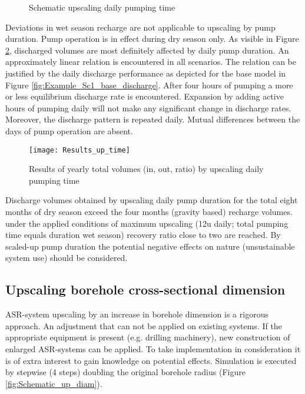 \begin{figure}[H]
\centering
{}
\captionsetup{justification=centering}
\caption{Schematic upscaling daily pumping time}
\label{fig:Schematic_up_time}
\end{figure}

Deviations in wet season recharge are not applicable to upscaling by pump duration. Pump operation is in effect during dry season only. As visible in Figure \ref{fig:Results_up_time}, discharged volumes are most definitely affected by daily pump duration. An approximately linear relation is encountered in all scenarios. The relation can be justified by the daily discharge performance as depicted for the base model in Figure \ref{fig:Example_Sc1_base_discharge}. After four hours of pumping a more or less equilibrium discharge rate is encountered. Expansion by adding active hours of pumping daily will not make any significant change in discharge rates. Moreover, the discharge pattern is repeated daily. Mutual differences between the days of pump operation are absent. \\

\begin{figure}[h!]
 \centering
 \texttt{[image: Results\_up\_time]}
 \captionsetup{justification=centering} 
 \caption{Results of yearly total volumes (in, out, ratio) by upscaling daily pumping time}
 \label{fig:Results_up_time}
\end{figure}

Discharge volumes obtained by upscaling daily pump duration for the total eight months of dry season exceed the four months (gravity based) recharge volumes. under the applied conditions of maximum upscaling (12u daily; total pumping time equals duration wet season) recovery ratio close to two are reached. By scaled-up pump duration the potential negative effects on nature (unsustainable system use) should be considered.

\subsection{Upscaling borehole cross-sectional dimension}
\label{Subsec:Up_diam}
ASR-system upscaling by an increase in borehole dimension is a rigorous approach. An adjustment that can not be applied on existing systems. If the appropriate equipment is present (e.g. drilling machinery), new construction of enlarged ASR-systems can be applied. To take implementation in consideration it is of extra interest to gain knowledge on potential effects. Simulation is executed by stepwise (4 steps) doubling the original borehole radius (Figure \ref{fig:Schematic_up_diam}). 

